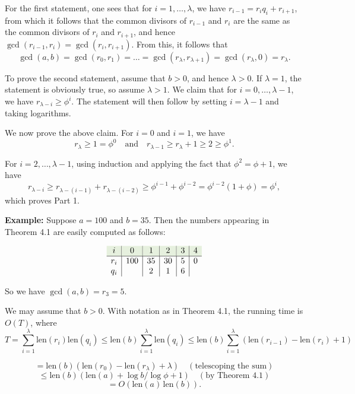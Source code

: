 \begin{Proof}

    For the first statement, one sees that for $i = 1, \dots, \lambda$, we have $r_{i-1} = r_i q_i + r_{i+1}$, from which it follows that the common divisors of $r_{i-1}$ and $r_i$ are the same as the common divisors of $r_i$ and $r_{i+1}$, and hence $\gcd(r_{i-1}, r_i) = \gcd(r_i, r_{i+1})$. From this, it follows that
    \[
    \gcd(a, b) = \gcd(r_0, r_1) = \dots = \gcd(r_\lambda, r_{\lambda+1}) = \gcd(r_\lambda, 0) = r_\lambda.
    \]
    
    \noindent
    To prove the second statement, assume that $b > 0$, and hence $\lambda > 0$. If $\lambda = 1$, the statement is obviously true, so assume $\lambda > 1$. We claim that for $i = 0, \dots, \lambda - 1$, we have $r_{\lambda-i} \geq \phi^i$. The statement will then follow by setting $i = \lambda - 1$ and taking logarithms.
    
    We now prove the above claim. For $i = 0$ and $i = 1$, we have
    \[
    r_\lambda \geq 1 = \phi^0 \quad \text{and} \quad r_{\lambda-1} \geq r_\lambda + 1 \geq 2 \geq \phi^1.
    \]
    
    \noindent
    For $i = 2, \dots, \lambda - 1$, using induction and applying the fact that $\phi^2 = \phi + 1$, we have
    \[
    r_{\lambda-i} \geq r_{\lambda-(i-1)} + r_{\lambda-(i-2)} \geq \phi^{i-1} + \phi^{i-2} = \phi^{i-2}(1 + \phi) = \phi^i,
    \]
    which proves Part 1.

\end{Proof}

\noindent
\textbf{Example:} Suppose $a = 100$ and $b = 35$. Then the numbers appearing in Theorem 4.1 are easily computed as follows:

\[
\begin{array}{c|c|c|c|c|c}
\rowcolor{OliveGreen!10}i      & 0   & 1   & 2   & 3   & 4   \\
\hline
r_i    & 100 & 35  & 30  & 5   & 0   \\
q_i    &     & 2   & 1   & 6   &     \\
\end{array}
\]

\noindent
So we have $\gcd(a, b) = r_3 = 5$.

\begin{Proof}

    We may assume that $b > 0$. With notation as in Theorem 4.1, the running time is $O(T)$, where
    \[
    T = \sum_{i=1}^{\lambda} \text{len}(r_i) \text{len}(q_i) \leq \text{len}(b) \sum_{i=1}^{\lambda} \text{len}(q_i) \leq \text{len}(b) \sum_{i=1}^{\lambda} (\text{len}(r_{i-1}) - \text{len}(r_i) + 1)
    \]
    
    \[
    = \text{len}(b)(\text{len}(r_0) - \text{len}(r_{\lambda}) + \lambda) \quad (\text{telescoping the sum})
    \]
    \[
    \leq \text{len}(b)(\text{len}(a) + \log b / \log \phi + 1) \quad (\text{by Theorem 4.1})
    \]
    \[
    = O(\text{len}(a) \, \text{len}(b)).
    \]
\end{Proof}

